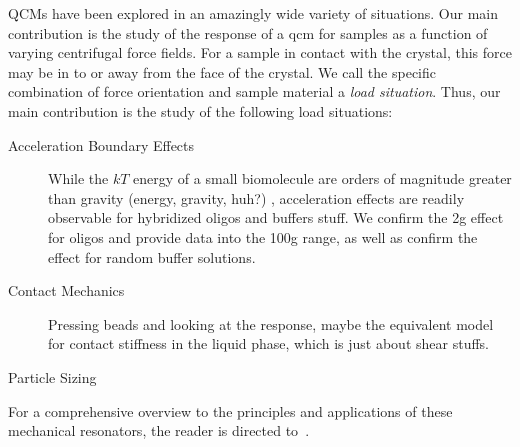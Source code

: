 QCMs have been explored in an amazingly wide variety of situations.  Our main
contribution is the study of the response of a \gls{qcm} for samples as
a function of varying centrifugal force fields.  For a sample in contact with
the crystal, this force may be in to or away from the face of the crystal.  We
call the specific combination of force orientation and sample material
a \textit{load situation}.  Thus, our main contribution is the study of the
following load situations:

\begin{description}
  \item[{Acceleration Boundary Effects}] While the $kT$ energy of a
        small biomolecule are orders of magnitude greater than gravity (energy,
        gravity, huh?)
        , acceleration effects are readily observable for hybridized
        oligos and buffers stuff.  We confirm the 2g effect for oligos and provide
        data into the 100g range, as well as confirm the effect for random buffer
        solutions.
  \item[{Contact Mechanics}] Pressing beads and looking at the response,
        maybe the equivalent model for contact stiffness in the liquid phase,
        which is just about shear stuffs.
  \item[{Particle Sizing}]
\end{description}

For a comprehensive overview to the principles and applications of these
mechanical resonators, the reader is directed
to~\cite{steinem2007piezoelectric}.

